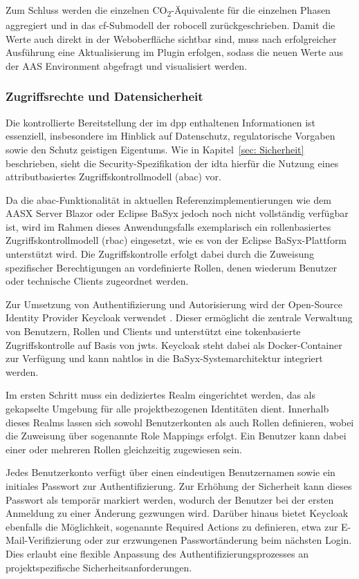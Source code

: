 Zum Schluss werden die einzelnen CO\textsubscript{2}-Äquivalente für die einzelnen Phasen aggregiert und in das \acs{cf}-Submodell der robocell zurückgeschrieben.
Damit die Werte auch direkt in der Weboberfläche sichtbar sind, muss nach erfolgreicher Ausführung eine Aktualisierung im Plugin erfolgen, sodass die neuen Werte aus der AAS Environment abgefragt und visualisiert werden.

\subsubsection{Zugriffsrechte und Datensicherheit}

Die kontrollierte Bereitstellung der im \acs{dpp} enthaltenen Informationen ist essenziell, insbesondere im Hinblick auf Datenschutz, regulatorische Vorgaben sowie den Schutz geistigen Eigentums.  
Wie in Kapitel~\ref{sec: Sicherheit} beschrieben, sieht die Security-Spezifikation der \acs{idta} hierfür die Nutzung eines attributbasiertes Zugriffskontrollmodell (\acs{abac}) vor.

Da die \acs{abac}-Funktionalität in aktuellen Referenzimplementierungen wie dem AASX Server Blazor oder Eclipse BaSyx jedoch noch nicht vollständig verfügbar ist, wird im Rahmen dieses Anwendungsfalls exemplarisch ein rollenbasiertes Zugriffskontrollmodell (\acs{rbac}) eingesetzt, wie es von der Eclipse BaSyx-Plattform unterstützt wird.  
Die Zugriffskontrolle erfolgt dabei durch die Zuweisung spezifischer Berechtigungen an vordefinierte Rollen, denen wiederum Benutzer oder technische Clients zugeordnet werden.

Zur Umsetzung von Authentifizierung und Autorisierung wird der Open-Source Identity Provider Keycloak verwendet \cite{Keycloak}.  
Dieser ermöglicht die zentrale Verwaltung von Benutzern, Rollen und Clients und unterstützt eine tokenbasierte Zugriffskontrolle auf Basis von \acsp{jwt}.  
Keycloak steht dabei als Docker-Container zur Verfügung und kann nahtlos in die BaSyx-Systemarchitektur integriert werden.

Im ersten Schritt muss ein dediziertes Realm eingerichtet werden, das als gekapselte Umgebung für alle projektbezogenen Identitäten dient.  
Innerhalb dieses Realms lassen sich sowohl Benutzerkonten als auch Rollen definieren, wobei die Zuweisung über sogenannte Role Mappings erfolgt.  
Ein Benutzer kann dabei einer oder mehreren Rollen gleichzeitig zugewiesen sein.

Jedes Benutzerkonto verfügt über einen eindeutigen Benutzernamen sowie ein initiales Passwort zur Authentifizierung.  
Zur Erhöhung der Sicherheit kann dieses Passwort als temporär markiert werden, wodurch der Benutzer bei der ersten Anmeldung zu einer Änderung gezwungen wird.  
Darüber hinaus bietet Keycloak ebenfalls die Möglichkeit, sogenannte Required Actions zu definieren, etwa zur E-Mail-Verifizierung oder zur erzwungenen Passwortänderung beim nächsten Login.  
Dies erlaubt eine flexible Anpassung des Authentifizierungsprozesses an projektspezifische Sicherheitsanforderungen.

